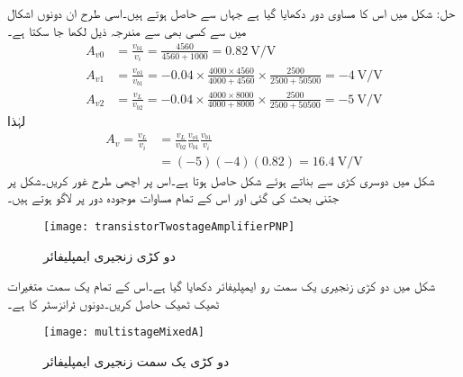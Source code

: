 حل: شکل  میں اس کا مساوی دور دکھایا گیا ہے جہاں سے  حاصل ہوتے ہیں۔اسی طرح ان دونوں اشکال میں سے کسی بھی سے مندرجہ ذیل لکھا جا سکتا ہے۔
\begin{align*}
A_{v0}&=\frac{v_{b1}}{v_i}=\frac{4560}{4560+1000}=\SI[per=frac,fraction=nice]{0.82}{\volt \per \volt}\\
A_{v1}&=\frac{v_{o1}}{v_{b1}}= -0.04 \times \frac{4000 \times 4560}{4000+4560} \times \frac{2500}{2500+50500}=\SI[per=frac,fraction=nice]{-4}{\volt \per \volt}\\
A_{v2}&=\frac{v_L}{v_{b2}}=-0.04 \times \frac{4000 \times 8000}{4000+8000} \times \frac{2500}{2500+50500}=\SI[per=frac,fraction=nice]{-5}{\volt \per \volt}
\end{align*}
لہٰذا
\begin{align*}
A_{v}=\frac{v_L}{v_i}&=\frac{v_L}{v_{b2}} \frac{v_{o1}}{v_{b1}} \frac{v_{b1}}{v_i}\\
&=\left(-5 \right) \left(-4 \right) \left(0.82 \right)=\SI[per=frac,fraction=nice]{16.4}{\volt \per \volt}
\end{align*}
شکل  میں دوسری کڑی  سے بناتے ہوئے شکل  حاصل ہوتا ہے۔اس پر اچھی طرح غور کریں۔شکل  پر جتنی بحث کی گئی اور اس کے تمام مساوات موجودہ دور پر لاگو ہوتے ہیں۔
\begin{figure}
\centering
\texttt{[image: transistorTwostageAmplifierPNP]}
\caption{دو کڑی زنجیری ایمپلیفائر}
\label{شکل_دو_کڑی_زنجیری_ایمپلیفائر_مثبت_منفی_مثبت}
\end{figure}
شکل  میں دو کڑی زنجیری یک سمت رو ایمپلیفائر دکھایا گیا ہے۔اس کے تمام یک سمت متغیرات ٹھیک ٹھیک  حاصل کریں۔دونوں ٹرانزسٹر کا  ہے۔
\begin{figure}
\centering
\texttt{[image: multistageMixedA]}
\caption{دو کڑی یک سمت زنجیری ایمپلیفائر}
\label{شکل_دو_کڑی_زنجیری_یکسمتی_ایمپلیفائر_مثبت_منفی_مثبت}
\end{figure}

